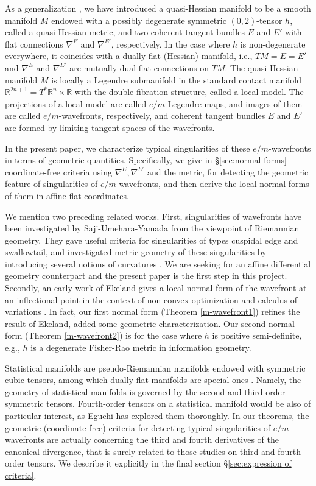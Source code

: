 \documentclass[10pt]{amsart}
\newcommand{\R}{\mathbb{R}}
\begin{document}
As a generalization \cite{NT}, we have introduced a quasi-Hessian manifold to be a smooth manifold $M$ endowed with a possibly degenerate symmetric $(0, 2)$-tensor $h$, called a quasi-Hessian metric, and two coherent tangent bundles $E$ and $E'$ with flat connections $\nabla^E$ and $\nabla^{E'}$, respectively.
In the case where $h$ is non-degenerate everywhere, it coincides with a dually flat (Hessian) manifold, i.e., $TM=E=E'$ and $\nabla^E$ and $\nabla^{E'}$ are mutually dual flat connections on $TM$.
The quasi-Hessian manifold $M$ is locally a Legendre submanifold in the standard contact manifold $\R^{2n+1}=T^*\R^n\times \R$ with the double fibration structure, called a local model. 
The projections of a local model are called $e/m$-Legendre maps, and images of them are called $e/m$-wavefronts, respectively, and coherent tangent bundles $E$ and $E'$ are formed by limiting tangent spaces of the wavefronts.

In the present paper, we characterize typical singularities of these $e/m$-wavefronts in terms of geometric quantities.
Specifically, we give in \S\ref{sec:normal forms} coordinate-free criteria
using $\nabla^E, \nabla^{E'}$ and the metric, for detecting the geometric feature of singularities of $e/m$-wavefronts, and then derive the local normal forms of them in affine flat coordinates.

We mention two preceding related works. 
First, singularities of wavefronts have been investigated by Saji-Umehara-Yamada from the viewpoint of Riemannian geometry.
They gave useful criteria for singularities of types cuspidal edge and swallowtail, and investigated metric geometry of these singularities by introducing several notions of curvatures \cite{KRSUY, SUY}.
We are seeking for an affine differential geometry counterpart and the present paper is the first step in this project.
Secondly, an early work of Ekeland gives a local normal form of the wavefront at an inflectional point in the context of non-convex optimization and calculus of variations \cite{Ekeland}.
In fact, our first normal form (Theorem \ref{m-wavefront1}) refines the result of Ekeland, added some geometric characterization.
Our second normal form (Theorem \ref{m-wavefront2}) is for the case where $h$ is positive semi-definite, e.g., $h$ is a degenerate Fisher-Rao metric in information geometry. 

Statistical manifolds are pseudo-Riemannian manifolds endowed with symmetric cubic tensors, among which dually flat manifolds are special ones   \cite{AmariNagaoka00, Amari16}. 
Namely, the geometry of statistical manifolds is governed by the second and third-order symmetric tensors. 
Fourth-order tensors on a statistical manifold would be also of particular interest, as Eguchi \cite{Eguchi} has explored them thoroughly. In our theorems, the geometric (coordinate-free) criteria for detecting typical singularities of $e/m$-wavefronts are actually concerning the third and fourth derivatives of the canonical divergence,  that is surely related to those studies on third and fourth-order tensors. We describe it explicitly in the final section \S \ref{sec:expression of criteria}. 
\end{document}
